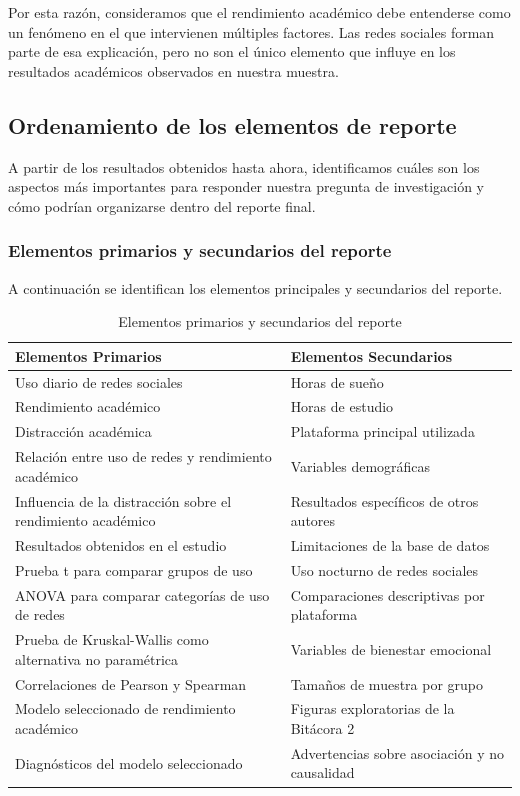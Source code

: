 \documentclass[12pt]{article}
\begin{document}
Por esta razón, consideramos que el rendimiento académico debe entenderse como un fenómeno en el que intervienen múltiples factores. Las redes sociales forman parte de esa explicación, pero no son el único elemento que influye en los resultados académicos observados en nuestra muestra.





\subsection{Ordenamiento de los elementos de reporte}
A partir de los resultados obtenidos hasta ahora, identificamos cuáles son los aspectos más importantes para responder nuestra pregunta de investigación y cómo podrían organizarse dentro del reporte final.

\subsubsection{Elementos primarios y secundarios del reporte}
A continuación se identifican los elementos principales y secundarios del reporte.

\begin{table}[H]
\centering
\caption{Elementos primarios y secundarios del reporte}
\begin{tabular}{p{6cm} p{6cm}}
\toprule
\textbf{Elementos Primarios} & \textbf{Elementos Secundarios} \\
\midrule
Uso diario de redes sociales & Horas de sueño \\
Rendimiento académico & Horas de estudio \\
Distracción académica & Plataforma principal utilizada \\
Relación entre uso de redes y rendimiento académico & Variables demográficas \\
Influencia de la distracción sobre el rendimiento académico & Resultados específicos de otros autores \\
Resultados obtenidos en el estudio & Limitaciones de la base de datos \\
Prueba t para comparar grupos de uso & Uso nocturno de redes sociales \\
ANOVA para comparar categorías de uso de redes & Comparaciones descriptivas por plataforma \\
Prueba de Kruskal-Wallis como alternativa no paramétrica & Variables de bienestar emocional \\
Correlaciones de Pearson y Spearman & Tamaños de muestra por grupo \\
Modelo seleccionado de rendimiento académico & Figuras exploratorias de la Bitácora 2 \\
Diagnósticos del modelo seleccionado & Advertencias sobre asociación y no causalidad \\
\bottomrule
\end{tabular}
\end{table}
\end{document}
